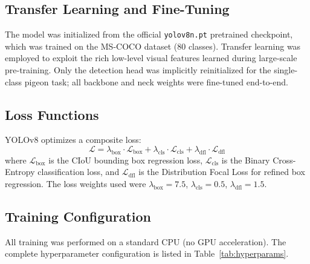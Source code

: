 \documentclass[journal]{IEEEtran}
\begin{document}
\subsection{Transfer Learning and Fine-Tuning}
The model was initialized from the official \texttt{yolov8n.pt} pretrained checkpoint, which was trained on the MS-COCO dataset \cite{lin2014coco} (80 classes). Transfer learning was employed to exploit the rich low-level visual features learned during large-scale pre-training. Only the detection head was implicitly reinitialized for the single-class pigeon task; all backbone and neck weights were fine-tuned end-to-end.

\subsection{Loss Functions}
YOLOv8 optimizes a composite loss:
\[
\mathcal{L} = \lambda_{\text{box}} \cdot \mathcal{L}_{\text{box}} + \lambda_{\text{cls}} \cdot \mathcal{L}_{\text{cls}} + \lambda_{\text{dfl}} \cdot \mathcal{L}_{\text{dfl}}
\]
where \( \mathcal{L}_{\text{box}} \) is the CIoU bounding box regression loss, \( \mathcal{L}_{\text{cls}} \) is the Binary Cross-Entropy classification loss, and \( \mathcal{L}_{\text{dfl}} \) is the Distribution Focal Loss for refined box regression. The loss weights used were \( \lambda_{\text{box}} = 7.5 \), \( \lambda_{\text{cls}} = 0.5 \), \( \lambda_{\text{dfl}} = 1.5 \).

\subsection{Training Configuration}
All training was performed on a standard CPU (no GPU acceleration). The complete hyperparameter configuration is listed in Table~\ref{tab:hyperparams}.
\end{document}
